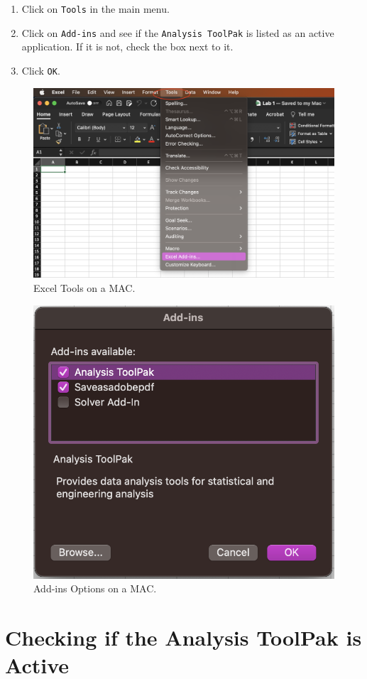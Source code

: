 \documentclass[
]{book}
\providecommand{\tightlist}{%
  \setlength{\itemsep}{0pt}\setlength{\parskip}{0pt}}
\begin{document}
\begin{enumerate}
\def\labelenumi{\arabic{enumi}.}
\tightlist
\item
  Click on \texttt{Tools} in the main menu.
\item
  Click on \texttt{Add-ins} and see if the \texttt{Analysis\ ToolPak} is listed as an active application. If it is not, check the box next to it.
\item
  Click \texttt{OK}.
\end{enumerate}

\begin{figure}

{\centering \includegraphics[width=0.75\linewidth]{images/toolpak_mac1} 

}

\caption{Excel Tools on a MAC.}\label{fig:analysis-toolpak-mac1}
\end{figure}
\begin{figure}

{\centering \includegraphics[width=0.4\linewidth]{images/toolpak_mac2} 

}

\caption{Add-ins Options on a MAC.}\label{fig:analysis-toolpak-mac2}
\end{figure}

\hypertarget{checking-if-the-analysis-toolpak-is-active}{%
\section{Checking if the Analysis ToolPak is Active}\label{checking-if-the-analysis-toolpak-is-active}}
\end{document}
